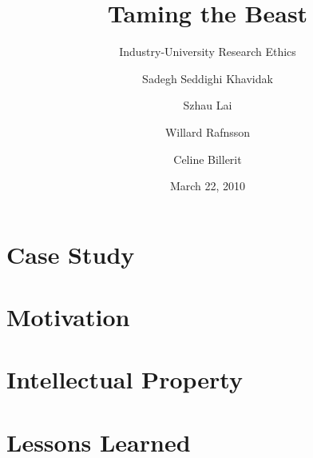 \documentclass[14pt,xcolor=x11names,mathserif,british,slidestop]{beamer} %
\title{Taming the Beast}
\subtitle{Industry-University Research Ethics}
\author{Sadegh Seddighi Khavidak \and Szhau Lai \and Willard Rafnsson \and Celine Billerit}
\date{March 22, 2010}
\institute{Chalmers University of Technology}
\begin{document}

\frame{\titlepage}


\section{Case Study}


\section{Motivation}


\section{Intellectual Property}


\section{Lessons Learned}


\end{document}
